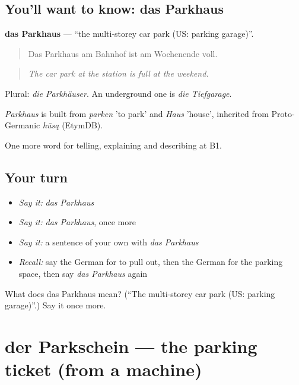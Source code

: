\subsection*{You'll want to know: das Parkhaus}
\textbf{das Parkhaus} — \textquotedblleft{}the multi-storey car park (US: parking garage)\textquotedblright{}.

\begin{quote}
Das Parkhaus am Bahnhof ist am Wochenende voll.
\end{quote}

\begin{quote}
\emph{The car park at the station is full at the weekend.}
\end{quote}

Plural: \emph{die Parkhäuser}. An underground one is \emph{die Tiefgarage}.

\begin{cousinweb}
\emph{Parkhaus} is built from \emph{parken} 'to park' and \emph{Haus} 'house', inherited from Proto-Germanic \emph{hūsą} (EtymDB).
\end{cousinweb}

\begin{grammarlens}[title={What you've built}]
One more word for telling, explaining and describing at B1.
\end{grammarlens}

\subsection*{Your turn}
\begin{itemize}
\raggedright
  \item \emph{Say it:} \emph{das Parkhaus}
  \item \emph{Say it:} \emph{das Parkhaus}, once more
  \item \emph{Say it:} a sentence of your own with \emph{das Parkhaus}
  \item \emph{Recall:} say the German for to pull out, then the German for the parking space, then say \emph{das Parkhaus} again
\end{itemize}

\begin{tcolorbox}[breakable,colback=teal!4,colframe=teal!35!black,title={Before you move on}]
What does das Parkhaus mean? (\textquotedblleft{}The multi-storey car park (US: parking garage)\textquotedblright{}.) Say it once more.
\end{tcolorbox}
\section[der Parkschein]{der Parkschein — the parking ticket (from a machine)}

